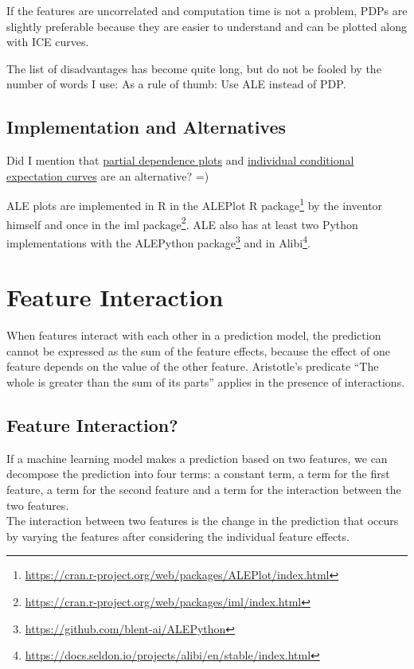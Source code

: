 \documentclass[12pt,]{krantz}
\renewcommand{\href}[2]{#2\footnote{\url{#1}}}
\begin{document}
If the features are uncorrelated and computation time is not a problem,
PDPs are slightly preferable because they are easier to understand and
can be plotted along with ICE curves.

The list of disadvantages has become quite long, but do not be fooled by
the number of words I use: As a rule of thumb: Use ALE instead of PDP.

\subsection{Implementation and
Alternatives}\label{implementation-and-alternatives}

Did I mention that \protect\hyperlink{pdp}{partial dependence plots} and
\protect\hyperlink{ice}{individual conditional expectation curves} are
an alternative? =)

ALE plots are implemented in R in the
\href{https://cran.r-project.org/web/packages/ALEPlot/index.html}{ALEPlot
R package} by the inventor himself and once in the
\href{https://cran.r-project.org/web/packages/iml/index.html}{iml
package}. ALE also has at least two Python implementations with the
\href{https://github.com/blent-ai/ALEPython}{ALEPython package} and in
\href{https://docs.seldon.io/projects/alibi/en/stable/index.html}{Alibi}.

\newpage

\hypertarget{interaction}{\section{Feature
Interaction}\label{interaction}}

When features interact with each other in a prediction model, the
prediction cannot be expressed as the sum of the feature effects,
because the effect of one feature depends on the value of the other
feature. Aristotle's predicate ``The whole is greater than the sum of
its parts'' applies in the presence of interactions.

\subsection{Feature Interaction?}\label{feature-interaction}

If a machine learning model makes a prediction based on two features, we
can decompose the prediction into four terms: a constant term, a term
for the first feature, a term for the second feature and a term for the
interaction between the two features.\\
The interaction between two features is the change in the prediction
that occurs by varying the features after considering the individual
feature effects.
\end{document}
